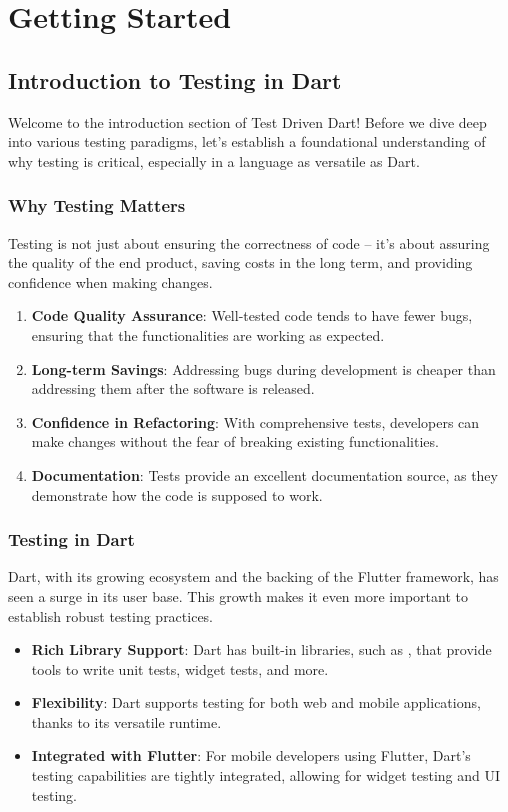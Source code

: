 \section{Getting Started}\label{getting-started}

\subsection{Introduction to Testing in Dart}

Welcome to the introduction section of Test Driven Dart! Before we dive deep into various testing paradigms, let's establish a foundational understanding of why testing is critical, especially in a language as versatile as Dart.

\subsubsection*{Why Testing Matters}

Testing is not just about ensuring the correctness of code – it's about assuring the quality of the end product, saving costs in the long term, and providing confidence when making changes.

\begin{enumerate}
    \item \textbf{Code Quality Assurance}: Well-tested code tends to have fewer bugs, ensuring that the functionalities are working as expected.
    \item \textbf{Long-term Savings}: Addressing bugs during development is cheaper than addressing them after the software is released.
    \item \textbf{Confidence in Refactoring}: With comprehensive tests, developers can make changes without the fear of breaking existing functionalities.
    \item \textbf{Documentation}: Tests provide an excellent documentation source, as they demonstrate how the code is supposed to work.
\end{enumerate}

\subsubsection*{Testing in Dart}

Dart, with its growing ecosystem and the backing of the Flutter framework, has seen a surge in its user base. 
This growth makes it even more important to establish robust testing practices.

\begin{itemize}
    \item \textbf{Rich Library Support}: Dart has built-in libraries, such as , that provide tools to write unit tests, widget tests, and more.
    \item \textbf{Flexibility}: Dart supports testing for both web and mobile applications, thanks to its versatile runtime.
    \item \textbf{Integrated with Flutter}: For mobile developers using Flutter, Dart's testing capabilities are tightly integrated, allowing for widget testing and UI testing.
\end{itemize}

